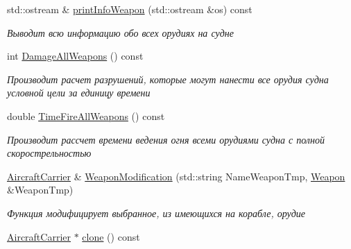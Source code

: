 \begin{DoxyCompactItemize}
\mbox{\label{class_aircraft_carrier_group_1_1_aircraft_carrier_a7ca6cefb553d9f6c0b62874f6bf7ec95}} 
std\+::ostream \& \mbox{\hyperlink{class_aircraft_carrier_group_1_1_aircraft_carrier_a7ca6cefb553d9f6c0b62874f6bf7ec95}{print\+Info\+Weapon}} (std\+::ostream \&os) const
\begin{DoxyCompactList}\small\item\em Выводит всю информацию обо всех орудиях на судне \end{DoxyCompactList}\item 
\mbox{\label{class_aircraft_carrier_group_1_1_aircraft_carrier_ab2caba5f25f136dff2354539b47ff68c}} 
int \mbox{\hyperlink{class_aircraft_carrier_group_1_1_aircraft_carrier_ab2caba5f25f136dff2354539b47ff68c}{Damage\+All\+Weapons}} () const
\begin{DoxyCompactList}\small\item\em Производит расчет разрушений, которые могут нанести все орудия судна условной цели за единицу времени \end{DoxyCompactList}\item 
\mbox{\label{class_aircraft_carrier_group_1_1_aircraft_carrier_a6613d24d38f7a28d20f35437bc069f98}} 
double \mbox{\hyperlink{class_aircraft_carrier_group_1_1_aircraft_carrier_a6613d24d38f7a28d20f35437bc069f98}{Time\+Fire\+All\+Weapons}} () const
\begin{DoxyCompactList}\small\item\em Производит рассчет времени ведения огня всеми орудиями судна с полной скорострельностью \end{DoxyCompactList}\item 
\mbox{\hyperlink{class_aircraft_carrier_group_1_1_aircraft_carrier}{Aircraft\+Carrier}} \& \mbox{\hyperlink{class_aircraft_carrier_group_1_1_aircraft_carrier_a36f838dfc52ea713a12ab74a2ebe237d}{Weapon\+Modification}} (std\+::string Name\+Weapon\+Tmp, \mbox{\hyperlink{class_aircraft_carrier_group_1_1_weapon}{Weapon}} \&Weapon\+Tmp)
\begin{DoxyCompactList}\small\item\em Функция модифицирует выбранное, из имеющихся на корабле, орудие \end{DoxyCompactList}\item 
\mbox{\hyperlink{class_aircraft_carrier_group_1_1_aircraft_carrier}{Aircraft\+Carrier}} $\ast$ \mbox{\hyperlink{class_aircraft_carrier_group_1_1_aircraft_carrier_ab2f921c586a31f9933874f437baf9c16}{clone}} () const

\end{DoxyCompactItemize}
